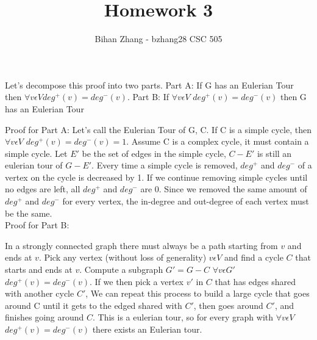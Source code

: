 \documentclass[12pt]{article}
\newenvironment{question}[2][Question]{\begin{trivlist}
		\item[\hskip \labelsep {\bfseries #1}\hskip \labelsep {\bfseries #2.}]}{\end{trivlist}}
\begin{document}
	
	
	
	\title{Homework 3}%
	\author{Bihan Zhang - bzhang28 %
		CSC 505} %
	
	\maketitle
	
	
	\begin{question}{1}
	Let's decompose this proof into two parts. Part A: If G has an Eulerian Tour then $\forall {v \epsilon V}$$deg^+(v)= deg^-(v)$. Part B: If $\forall {v \epsilon V}$ $deg^+(v)= deg^-(v)$ then G has an Eulerian Tour
	
	Proof for Part A:
	 Let's call the Eulerian Tour of G, C. If C is a simple cycle, then $\forall {v \epsilon V}$ $deg^+(v)= deg^-(v)=1$. Assume C is a complex cycle, it must contain a simple cycle. Let $E'$ be the set of edges in the simple cycle, $C-E'$ is still an eulerian tour of $G-E'$. Every time a simple cycle is removed, $deg^+$ and $deg^-$ of a vertex on the cycle is decreased by 1. If we continue removing simple cycles until no edges are left, all $deg^+$ and $deg^-$ are 0. Since we removed the same amount of $deg^+$ and $deg^-$ for every vertex, the in-degree and out-degree of each vertex must be the same.\\
	
	Proof for Part B:
	
	In a strongly connected graph there must always be a path starting from $v$ and ends at $v$. Pick any vertex (without loss of generality) $v \epsilon V$ and find a cycle $C$ that starts and ends at $v$. Compute a subgraph $G'=G-C$ $\forall {v \epsilon G'}$ $deg^+(v)= deg^-(v)$. If we then pick a vertex $v'$ in $C$ that has edges shared with another cycle $C'$, We can repeat this process to build a large cycle that goes around C until it gets to the edged shared with $C'$, then goes around $C'$, and finishes going around $C$. This is a eulerian tour, so for every graph with $\forall {v \epsilon V}$$deg^+(v)= deg^-(v)$ there exists an Eulerian tour.
	
	
	\end{question}
\end{document}
